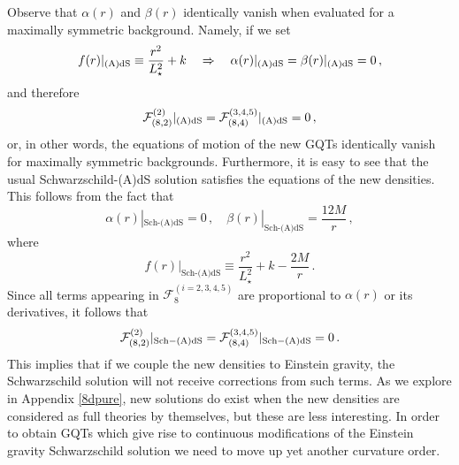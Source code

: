 \documentclass[11pt]{article}
\begin{document}
{Observe that $\alpha(r)$ and $\beta(r)$ identically vanish when evaluated for a maximally symmetric background. Namely, if we set 
\begin{equation}\label{ads}
f(r)|_{\rm (A)dS}\equiv \frac{r^2}{L_{\star}^2}+k \quad  \Rightarrow \quad \alpha(r)|_{\rm (A)dS}=\beta(r)|_{\rm (A)dS}=0\, ,
\end{equation}
 and therefore
\begin{equation}
\mathcal{F}_{(8,2)}^{(2)}|_{\rm (A)dS}=\mathcal{F}_{(8,4)}^{(3,4,5)}|_{\rm (A)dS}=0\, ,
\end{equation}
or, in other words, the equations of motion of the new GQTs identically vanish for maximally symmetric backgrounds. Furthermore, it is easy to see that the usual Schwarzschild-(A)dS solution satisfies the equations of the new densities. This follows from the fact that 
\begin{equation}
\alpha(r)|_{ \text{Sch-(A)dS}}=0\, , \quad \beta(r)|_{ \text{Sch-(A)dS}}=\frac{12M}{r}\, ,
\end{equation}
where
\begin{equation}
f(r)|_{\text{Sch-(A)dS}}\equiv \frac{r^2}{L_{\star}^2}+k-\frac{2M}{r}\, .
\end{equation}
Since all terms appearing in $\mathcal{F}_{8}^{(i=2,3,4,5)}$ are proportional to $\alpha(r)$ or its derivatives, it follows that 
\begin{equation}
\mathcal{F}_{(8,2)}^{(2)}|_{\rm Sch-(A)dS}=\mathcal{F}_{(8,4)}^{(3,4,5)}|_{\rm Sch-(A)dS}=0\, .
\end{equation}
This implies that if we couple the new densities to Einstein gravity, the Schwarzschild solution will not receive corrections from such terms. As we explore in Appendix \ref{8dpure}, new solutions do exist when the new densities are considered as full theories by themselves, but these are less interesting. In order to obtain GQTs which give rise to continuous modifications of the Einstein gravity Schwarzschild solution we need to move up yet another curvature order.




}
\end{document}

